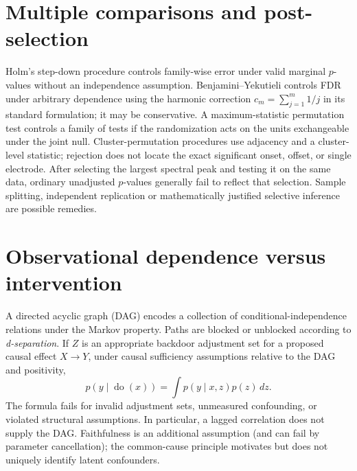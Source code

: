 \section{Multiple comparisons and post-selection}
Holm's step-down procedure controls family-wise error under
valid marginal $p$-values without an independence assumption.
Benjamini--Yekutieli controls FDR under arbitrary dependence
using the harmonic correction $c_m=\sum_{j=1}^m1/j$
in its standard formulation; it may be conservative.
A maximum-statistic permutation test controls a family of tests
if the randomization acts on the units exchangeable under the
joint null. Cluster-permutation procedures use adjacency
and a cluster-level statistic; rejection does not locate the
exact significant onset, offset, or single electrode.
After selecting the largest spectral peak and testing it
on the same data, ordinary unadjusted $p$-values generally
fail to reflect that selection. Sample splitting, independent
replication or mathematically justified selective inference
are possible remedies.

\section{Observational dependence versus intervention}
A directed acyclic graph (DAG) encodes a collection of
conditional-independence relations under the Markov property.
Paths are blocked or unblocked according to \emph{d-separation}.
If $Z$ is an appropriate backdoor adjustment set for a proposed
causal effect $X\to Y$, under causal sufficiency assumptions
relative to the DAG and positivity,
\[
p(y\mid\operatorname{do}(x))
=\int p(y\mid x,z)p(z)\,dz.
\]
The formula fails for invalid adjustment sets, unmeasured
confounding, or violated structural assumptions. In particular,
a lagged correlation does not supply the DAG.
Faithfulness is an additional assumption (and can fail by
parameter cancellation); the common-cause principle motivates
but does not uniquely identify latent confounders.


